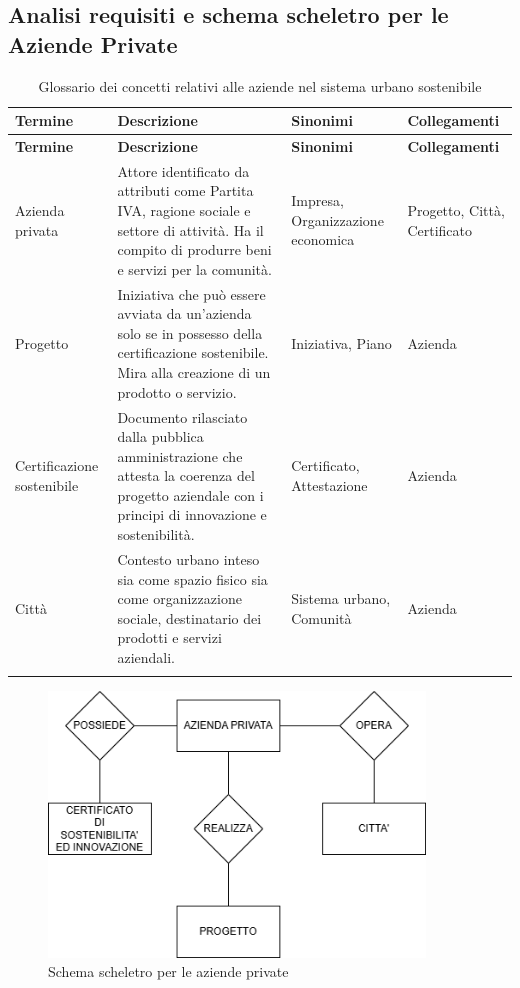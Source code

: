 \documentclass{article}
\begin{document}

\newpage
\subsection{Analisi requisiti e schema scheletro per le Aziende Private}

\begin{longtable}{|p{3cm}|p{6.5cm}|p{2.5cm}|p{3cm}|}
\hline
\textbf{Termine} & \textbf{Descrizione} & \textbf{Sinonimi} & \textbf{Collegamenti} \\
\hline
\endfirsthead

\hline
\textbf{Termine} & \textbf{Descrizione} & \textbf{Sinonimi} & \textbf{Collegamenti} \\
\hline
\endhead

Azienda privata & Attore identificato da attributi come Partita IVA, ragione sociale e settore di attività. Ha il compito di produrre beni e servizi per la comunità. & Impresa, Organizzazione economica & Progetto, Città, Certificato \\
\hline

Progetto & Iniziativa che può essere avviata da un’azienda solo se in possesso della certificazione sostenibile. Mira alla creazione di un prodotto o servizio. & Iniziativa, Piano & Azienda \\
\hline

Certificazione sostenibile & Documento rilasciato dalla pubblica amministrazione che attesta la coerenza del progetto aziendale con i principi di innovazione e sostenibilità. & Certificato, Attestazione & Azienda \\
\hline

Città & Contesto urbano inteso sia come spazio fisico sia come organizzazione sociale, destinatario dei prodotti e servizi aziendali. & Sistema urbano, Comunità & Azienda \\
\hline

\caption{Glossario dei concetti relativi alle aziende nel sistema urbano sostenibile}
\label{tab:glossario-aziende}
\end{longtable}

\begin{figure}[H]
    \centering
    \includegraphics[width=10cm]{images/SCHEMA_SCHELETRO_AZIENDA.drawio.png}
    \caption{Schema scheletro per le aziende private}
    \label{fig:schema-sostenibilita}
\end{figure}
\end{document}
